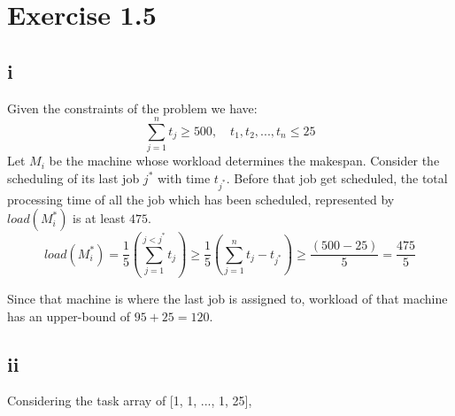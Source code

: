 \documentclass[11pt]{article}
\begin{document}
\section*{Exercise 1.5}
\subsection*{i} \noindent
Given the constraints of the problem we have:
\[ 
\sum_{j=1}^{n} t_{j} \geq 500, \quad t_{1}, t_{2}, ..., t_{n} \leq 25
\]
Let $M_{i}$ be the machine whose workload determines the makespan. 
Consider the scheduling of its last job $j^{*}$ with time $t_{j^{*}}$. Before that job get scheduled, 
the total processing time of all the job which has been scheduled, represented by $load(M_{i}^{*})$ is at least $475$.
\[ load(M_{i}^{*}) = 
\frac{1}{5}(\sum_{j=1}^{j < j^{*}} t_{j}) \geq \frac{1}{5}(\sum_{j=1}^{n} t_{j}- t_{j^{*}}) 
\geq \frac{(500 - 25)}{5} = \frac{475}{5}
\]

Since that machine is where the last job is assigned to, workload of that machine has an upper-bound of $95 + 25 = 120$.

\subsection*{ii} \noindent
Considering the task array of [1, 1, ..., 1, 25], 
\end{document}
